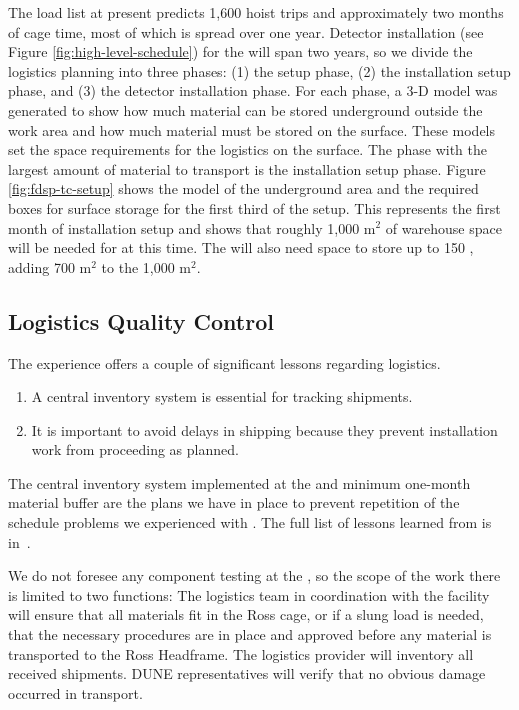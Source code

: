 The load list at present predicts 1,600 hoist trips and approximately two  months of cage time, most of which is spread over one year. 
Detector installation (see Figure \ref{fig:high-level-schedule}) for the  will span two years, so we divide the logistics planning into three phases: (1) the  setup phase, (2) the installation setup phase, and (3) the detector installation phase. 
For each phase, a 3-D model was generated to show how much material can be stored underground outside the work area and how much material must be stored on the surface. 
These models set the space requirements for the logistics on the surface. 
The phase with the largest amount of material to transport is the installation setup phase.  
Figure \ref{fig:fdsp-tc-setup} shows the model of the underground area and the required boxes for surface storage for the first third of the setup. 
This represents the first month of installation setup and shows that roughly 1,000 m$^2$ of warehouse space will be needed for  at this time.  The  will also need space to store up to 150 , 
adding 700 m$^2$ to the 1,000 m$^2$. 


\subsection{Logistics Quality Control}
\label{sec:fdsp-tc-log-qaqc}


 
The  experience offers a couple of significant lessons regarding logistics.

\begin{enumerate}
\item A central inventory system is essential for tracking  shipments.
\item It is important to avoid delays in shipping because they prevent installation work from  proceeding as planned. 
\end{enumerate}

The central inventory system  implemented at the   and minimum one-month material buffer are the plans we have in place to prevent repetition of the schedule problems we experienced with .   The full list of lessons learned from  is in~\cite{bib:docdb8255}. 

We do not foresee any component testing at the , so the scope of the  work there is limited to two functions: 
The  logistics team in coordination with the facility will ensure that all materials fit in the Ross cage, or if a slung load is needed, that the necessary procedures are in place and approved before any material is transported to the Ross Headframe.  
The logistics provider will inventory all received shipments. DUNE representatives will verify that no obvious damage occurred in transport.

